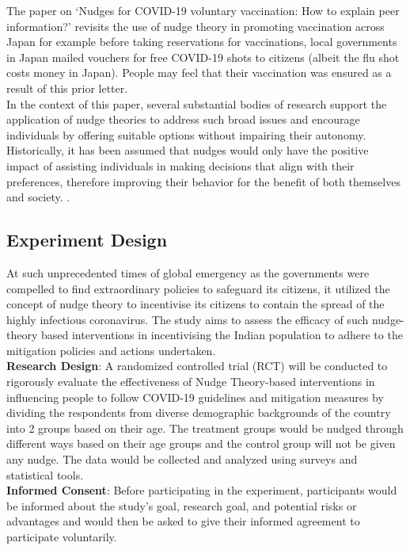 \documentclass[12pt, a4paper]{article}
\begin{document}
The paper on ‘Nudges for COVID-19 voluntary vaccination: How to explain peer information?’ \citep{article8} revisits the use of nudge theory in promoting vaccination across Japan for example before taking reservations for vaccinations, local governments in Japan mailed vouchers for free COVID-19 shots to citizens (albeit the flu shot costs money in Japan). People may feel that their vaccination was ensured as a result of this prior letter. \citep{article8}\\
In the context of this paper, several substantial bodies of research support the application of nudge theories to address such broad issues and encourage individuals by offering suitable options without impairing their autonomy. Historically, it has been assumed that nudges would only have the positive impact of assisting individuals in making decisions that align with their preferences, therefore improving their behavior for the benefit of both themselves and society. \citep{article8}.\\

\begin{center}
\section{Experiment Design}\end{center}
At such unprecedented times of global emergency as the governments were compelled to find extraordinary policies to safeguard its citizens, it utilized the concept of nudge theory to incentivise its citizens to contain the spread of the highly infectious coronavirus. The study aims to assess the efficacy of such nudge-theory based  interventions in incentivising the Indian population to adhere to the mitigation policies and actions undertaken.\\


\textbf{Research Design}: A randomized controlled trial (RCT) will be conducted to rigorously evaluate the effectiveness of Nudge Theory-based interventions in influencing people to follow COVID-19 guidelines and mitigation measures by dividing the respondents from diverse demographic backgrounds of the country into 2 groups based on their age. The treatment groups would be nudged through different ways based on their age groups and the control group will not be given any nudge. The data would be collected and analyzed using surveys and statistical tools.\\


\textbf{Informed Consent}: Before participating in the experiment, participants would be informed about the study’s goal, research goal, and potential risks or advantages and would then be asked to give their informed agreement to participate voluntarily.\\
\end{document}
